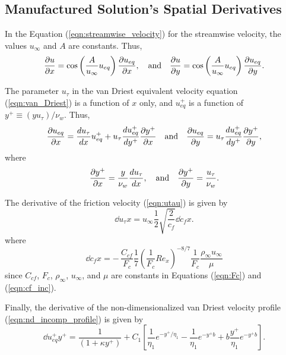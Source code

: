  \subsection{Manufactured Solution's Spatial Derivatives}\label{sec:derivatives}

In the Equation (\ref{eqn:streamwise_velocity}) for the streamwise velocity, the values $u_{\infty}$ and $A$ are constants.  Thus,
%
\begin{gather*}
\frac{\partial u}{\partial x} = \cos \left(\frac{A}{u_{\infty}} u_{eq} \right) \frac{\partial u_{eq}}{\partial x}, \quad \mbox{and} \quad
\frac{\partial u}{\partial y} = \cos \left(\frac{A}{u_{\infty}} u_{eq} \right) \frac{\partial u_{eq}}{\partial y}.
\end{gather*}
%

The parameter  $u_{\tau}$  in the van Driest equivalent velocity equation (\ref{eqn:van_Driest}) is a function of $x$ only, and $u_{eq}^+$ is  a function of $y^+ \equiv (y u_{\tau})/\nu_w$.  Thus,
\begin{align*}
\frac{\partial u_{eq}}{\partial x} = \frac{d u_{\tau}}{d x} u_{eq}^+ + u_{\tau} \frac{d u_{eq}^+}{d y^+} \frac{\partial y^+}{\partial x} \quad \mbox{and} \quad
\frac{\partial u_{eq}}{\partial y} =  u_{\tau} \frac{d u_{eq}^+}{d y^+} \frac{\partial y^+}{\partial y},
\end{align*}
%
where
%
\begin{gather*}
\frac{\partial y^+}{\partial x} = \frac{y}{\nu_w} \frac{d u_{\tau}}{d x},\quad \mbox{and} \quad
\frac{\partial y^+}{\partial y} = \frac{u_{\tau}}{\nu_w}.
\end{gather*}
%

The derivative of the  friction velocity (\ref{eqn:utau}) is given by
\begin{equation*}
\dd{u_{\tau}}{x} = u_{\infty}  \frac{1}{2} \sqrt{ \frac{2}{c_f} } \dd{c_f}{x}.
\end{equation*}
%
where \begin{equation*}
\dd{c_f}{x} = - \, \frac{C_{cf}}{F_c} \frac{1}{7} \left( \frac{1}{F_c} Re_x \right)^{-8/7} \frac{1}{F_c} \frac{\rho_{\infty} u_{\infty}}{\mu}
\end{equation*}
since $C_{cf}$, $F_c$, $\rho_{\infty}$, $u_{\infty}$, and $\mu$ are constants in Equations (\ref{eqn:Fc}) and (\ref{eqn:cf_inc}). 
%

Finally, the derivative of the non-dimensionalized van Driest velocity profile (\ref{eqn:nd_incomp_profile})  is given
by
\begin{equation*}
\dd{u_{eq}^+}{y^+} = \frac{1}{\left( 1 + \kappa y^+ \right)} + C_1 \left[ \frac{1}{\eta_1} e^{-y^+/\eta_1} - \frac{1}{\eta_1} e^{-y^+ b} + b \frac{y^+}{\eta_1} e^{-y^+ b} \right].
\end{equation*}
%

